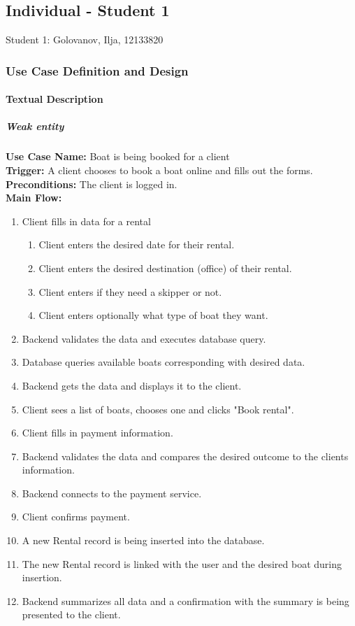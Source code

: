 \documentclass[a4paper, 11pt]{article}          %
\newcommand{\studentone}{Student 1: Golovanov, Ilja, 12133820}
\begin{document}
\newpage

\subsection{Individual - Student 1}
\studentone
\subsubsection{Use Case Definition and Design}
\paragraph*{Textual Description}
\subparagraph*{Weak entity}
\noindent
\textbf{Use Case Name:}                                        
Boat is being booked for a client\\
\textbf{Trigger:}                                           
A client chooses to book a boat online and fills out the forms.\\
\textbf{Preconditions:}                                     
The client is logged in.\\
\textbf{Main Flow:}                                          
\begin{enumerate}
    \item Client fills in data for a rental
    \begin{enumerate}
        \item Client enters the desired date for their rental.
        \item Client enters the desired destination (office) of their rental.
        \item Client enters if they need a skipper or not.
        \item Client enters optionally what type of boat they want.
    \end{enumerate}
    \item Backend validates the data and executes database query.
    \item Database queries available boats corresponding with desired data.
    \item Backend gets the data and displays it to the client.
    \item Client sees a list of boats, chooses one and clicks "Book rental".
    \item Client fills in payment information.
    \item Backend validates the data and compares the desired outcome to the clients information.
    \item Backend connects to the payment service.
    \item Client confirms payment.
    \item A new Rental record is being inserted into the database.
    \item The new Rental record is linked with the user and the desired boat during insertion.
    \item Backend summarizes all data and a confirmation with the summary is being presented to the client.
\end{enumerate}
\end{document}
